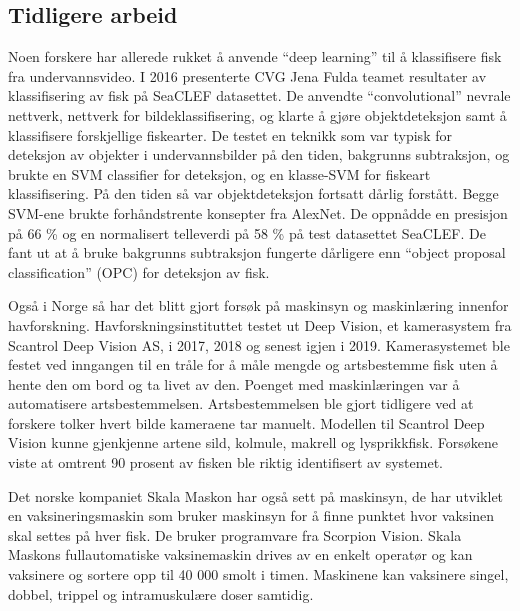 
\subsection{Tidligere arbeid}

Noen forskere har allerede rukket å anvende ``deep learning'' til å klassifisere fisk fra undervannsvideo. I 2016 presenterte CVG Jena Fulda teamet resultater av klassifisering av fisk på SeaCLEF datasettet. De anvendte ``convolutional'' nevrale nettverk, nettverk for bildeklassifisering, og klarte å gjøre objektdeteksjon samt å klassifisere forskjellige fiskearter. De testet en teknikk som var typisk for deteksjon av objekter i undervannsbilder på den tiden, bakgrunns subtraksjon, og brukte en SVM classifier for deteksjon, og en klasse-SVM for fiskeart klassifisering. På den tiden så var objektdeteksjon fortsatt dårlig forstått. Begge SVM-ene brukte forhåndstrente konsepter fra AlexNet. De oppnådde en presisjon på 66 \% og en normalisert telleverdi på 58 \% på test datasettet SeaCLEF. De fant ut at å bruke bakgrunns subtraksjon fungerte dårligere enn ``object proposal classification'' (OPC) for deteksjon av fisk. \cite{Rodner m.fl. 2016}


Også i Norge så har det blitt gjort forsøk på maskinsyn og maskinlæring innenfor havforskning. Havforskningsinstituttet testet ut Deep Vision, et kamerasystem fra Scantrol Deep Vision AS, i 2017, 2018 og senest igjen i 2019. Kamerasystemet ble festet ved inngangen til en tråle for å måle mengde og artsbestemme fisk uten å hente den om bord og ta livet av den. Poenget med maskinlæringen var å automatisere artsbestemmelsen. Artsbestemmelsen ble gjort tidligere ved at forskere tolker hvert bilde kameraene tar manuelt. Modellen til Scantrol Deep Vision kunne gjenkjenne artene sild, kolmule, makrell og lysprikkfisk. Forsøkene viste at omtrent 90 prosent av fisken ble riktig identifisert av systemet. \cite{Fenstad 2019}

Det norske kompaniet Skala Maskon har også sett på maskinsyn, de har utviklet en vaksineringsmaskin som bruker maskinsyn for å finne punktet hvor vaksinen skal settes på hver fisk. De bruker programvare fra Scorpion Vision. Skala Maskons fullautomatiske vaksinemaskin drives av en enkelt operatør og kan vaksinere og sortere opp til 40 000 smolt i timen. Maskinene kan vaksinere singel, dobbel, trippel og intramuskulære doser samtidig. \cite{Falstad 2016}

